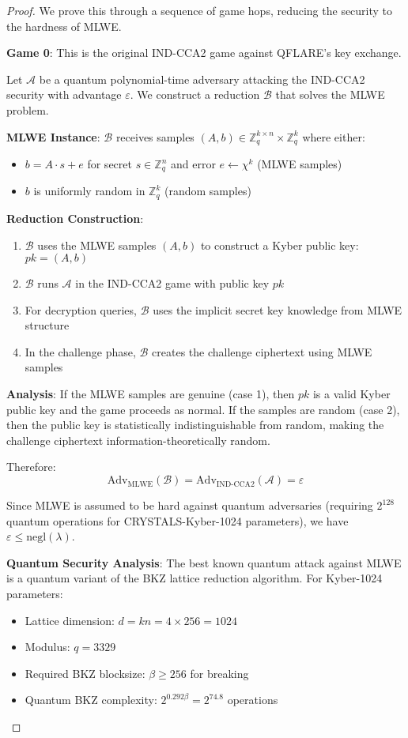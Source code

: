 \documentclass[11pt]{article}
\begin{document}
\begin{proof}
We prove this through a sequence of game hops, reducing the security to the hardness of MLWE.

\textbf{Game 0}: This is the original IND-CCA2 game against QFLARE's key exchange.

Let $\mathcal{A}$ be a quantum polynomial-time adversary attacking the IND-CCA2 security with 
advantage $\varepsilon$. We construct a reduction $\mathcal{B}$ that solves the MLWE problem.

\textbf{MLWE Instance}: $\mathcal{B}$ receives samples $(A, b) \in \mathbb{Z}_q^{k \times n} \times \mathbb{Z}_q^k$ 
where either:
\begin{itemize}
\item $b = A \cdot s + e$ for secret $s \in \mathbb{Z}_q^n$ and error $e \leftarrow \chi^k$ (MLWE samples)
\item $b$ is uniformly random in $\mathbb{Z}_q^k$ (random samples)
\end{itemize}

\textbf{Reduction Construction}:
\begin{enumerate}
\item $\mathcal{B}$ uses the MLWE samples $(A, b)$ to construct a Kyber public key: $pk = (A, b)$
\item $\mathcal{B}$ runs $\mathcal{A}$ in the IND-CCA2 game with public key $pk$
\item For decryption queries, $\mathcal{B}$ uses the implicit secret key knowledge from MLWE structure
\item In the challenge phase, $\mathcal{B}$ creates the challenge ciphertext using MLWE samples
\end{enumerate}

\textbf{Analysis}:
If the MLWE samples are genuine (case 1), then $pk$ is a valid Kyber public key and the game 
proceeds as normal. If the samples are random (case 2), then the public key is statistically 
indistinguishable from random, making the challenge ciphertext information-theoretically random.

Therefore:
$$\text{Adv}_{\text{MLWE}}(\mathcal{B}) = \text{Adv}_{\text{IND-CCA2}}(\mathcal{A}) = \varepsilon$$

Since MLWE is assumed to be hard against quantum adversaries (requiring $2^{128}$ quantum operations 
for CRYSTALS-Kyber-1024 parameters), we have $\varepsilon \leq \text{negl}(\lambda)$.

\textbf{Quantum Security Analysis}:
The best known quantum attack against MLWE is a quantum variant of the BKZ lattice reduction 
algorithm. For Kyber-1024 parameters:
\begin{itemize}
\item Lattice dimension: $d = kn = 4 \times 256 = 1024$
\item Modulus: $q = 3329$
\item Required BKZ blocksize: $\beta \geq 256$ for breaking
\item Quantum BKZ complexity: $2^{0.292\beta} = 2^{74.8}$ operations
\end{itemize}


\end{proof}
\end{document}

